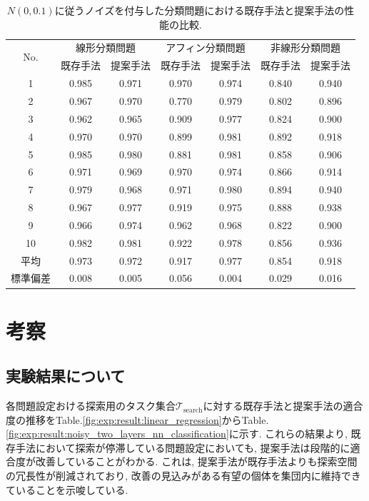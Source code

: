 \documentclass[11pt,oneside,openany,report]{jsbook}
\begin{document}
\begin{table}[tbp]
  \caption{$N(0,0.1)$に従うノイズを付与した分類問題における既存手法と提案手法の性能の比較.}
  \label{table:exp:result:classification_noizy_0.1}
  \centering
  \begin{tabular}{|c|c|c|c|c|c|c|}
    \hline
    \multirow{2}{*}{No. } & \multicolumn{2}{c|}{線形分類問題} & \multicolumn{2}{c|}{アフィン分類問題} & \multicolumn{2}{c|}{非線形分類問題} \\
    \cline{2-7}
    & 既存手法 & 提案手法 & 既存手法 & 提案手法 & 既存手法 & 提案手法 \\
    \hline \hline
    1       & 0.985 & 0.971 & 0.970 & 0.974 & 0.840 & 0.940 \\
    2       & 0.967 & 0.970 & 0.770 & 0.979 & 0.802 & 0.896 \\
    3       & 0.962 & 0.965 & 0.909 & 0.977 & 0.824 & 0.900 \\
    4       & 0.970 & 0.970 & 0.899 & 0.981 & 0.892 & 0.918 \\
    5       & 0.985 & 0.980 & 0.881 & 0.981 & 0.858 & 0.906 \\
    6       & 0.971 & 0.969 & 0.970 & 0.974 & 0.866 & 0.914 \\
    7       & 0.979 & 0.968 & 0.971 & 0.980 & 0.894 & 0.940 \\
    8       & 0.967 & 0.977 & 0.919 & 0.975 & 0.888 & 0.938 \\
    9       & 0.966 & 0.974 & 0.962 & 0.968 & 0.822 & 0.900 \\
    10      & 0.982 & 0.981 & 0.922 & 0.978 & 0.856 & 0.936 \\
    \hline
    平均 & 0.973 & 0.972 & 0.917 & 0.977 & 0.854 & 0.918  \\
    標準偏差 & 0.008 & 0.005 & 0.056 & 0.004 & 0.029 & 0.016 \\
    \hline
  \end{tabular}
\end{table}

\chapter{考察} \label{chap:consideration}

\section{実験結果について}
各問題設定おける探索用のタスク集合$\mathcal{T}_\mathrm{search}$に対する既存手法と提案手法の適合度の推移をTable.\ref{fig:exp:result:linear_regression}からTable.\ref{fig:exp:result:noisy_two_layers_nn_classification}に示す. これらの結果より, 既存手法において探索が停滞している問題設定においても, 提案手法は段階的に適合度が改善していることがわかる. これは, 提案手法が既存手法よりも探索空間の冗長性が削減されており, 改善の見込みがある有望の個体を集団内に維持できていることを示唆している.
\end{document}
